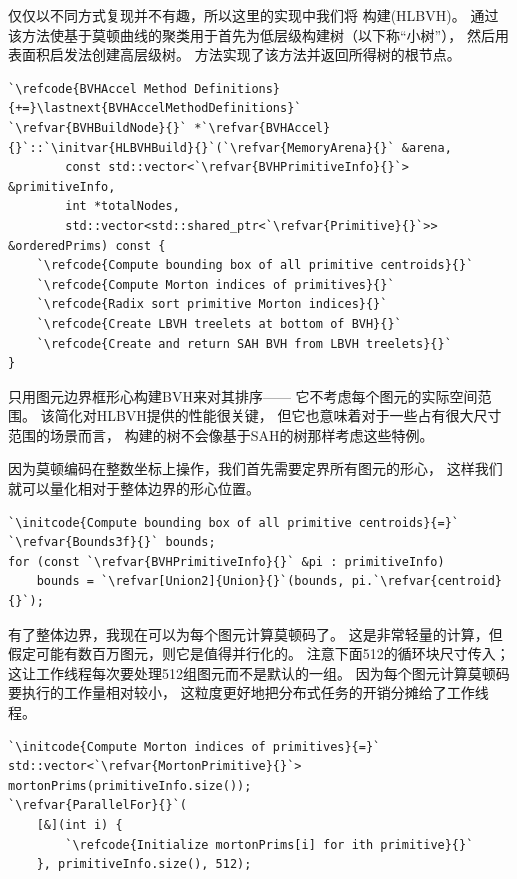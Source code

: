 仅仅以不同方式复现并不有趣，所以这里的实现中我们将
构建(HLBVH)。
通过该方法使基于莫顿曲线的聚类用于首先为低层级构建树（以下称“小树”），
然后用表面积启发法创建高层级树。
方法实现了该方法并返回所得树的根节点。
\begin{lstlisting}
`\refcode{BVHAccel Method Definitions}{+=}\lastnext{BVHAccelMethodDefinitions}`
`\refvar{BVHBuildNode}{}` *`\refvar{BVHAccel}{}`::`\initvar{HLBVHBuild}{}`(`\refvar{MemoryArena}{}` &arena, 
        const std::vector<`\refvar{BVHPrimitiveInfo}{}`> &primitiveInfo,
        int *totalNodes,
        std::vector<std::shared_ptr<`\refvar{Primitive}{}`>> &orderedPrims) const {
    `\refcode{Compute bounding box of all primitive centroids}{}`
    `\refcode{Compute Morton indices of primitives}{}`
    `\refcode{Radix sort primitive Morton indices}{}`
    `\refcode{Create LBVH treelets at bottom of BVH}{}`
    `\refcode{Create and return SAH BVH from LBVH treelets}{}`
}
\end{lstlisting}

只用图元边界框形心构建BVH来对其排序——
它不考虑每个图元的实际空间范围。
该简化对HLBVH提供的性能很关键，
但它也意味着对于一些占有很大尺寸范围的场景而言，
构建的树不会像基于SAH的树那样考虑这些特例。

因为莫顿编码在整数坐标上操作，我们首先需要定界所有图元的形心，
这样我们就可以量化相对于整体边界的形心位置。
\begin{lstlisting}
`\initcode{Compute bounding box of all primitive centroids}{=}`
`\refvar{Bounds3f}{}` bounds;
for (const `\refvar{BVHPrimitiveInfo}{}` &pi : primitiveInfo)
    bounds = `\refvar[Union2]{Union}{}`(bounds, pi.`\refvar{centroid}{}`);
\end{lstlisting}

有了整体边界，我现在可以为每个图元计算莫顿码了。
这是非常轻量的计算，但假定可能有数百万图元，则它是值得并行化的。
注意下面512的循环块尺寸传入；
这让工作线程每次要处理512组图元而不是默认的一组。
因为每个图元计算莫顿码要执行的工作量相对较小，
这粒度更好地把分布式任务的开销分摊给了工作线程。
\begin{lstlisting}
`\initcode{Compute Morton indices of primitives}{=}`
std::vector<`\refvar{MortonPrimitive}{}`> mortonPrims(primitiveInfo.size());
`\refvar{ParallelFor}{}`(
    [&](int i) {
        `\refcode{Initialize mortonPrims[i] for ith primitive}{}`
    }, primitiveInfo.size(), 512);
\end{lstlisting}

